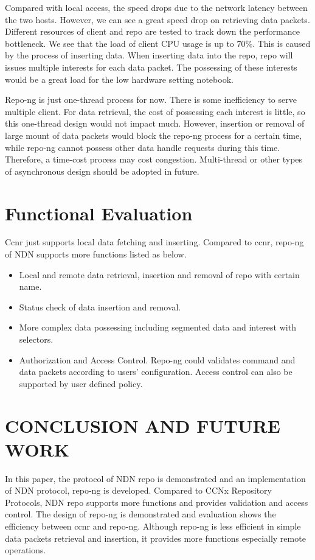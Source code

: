 \documentclass{acm_proc_article-sp}
\begin{document}
Compared with local access, the speed drops due to the network latency between the two hosts. However, we can see a great speed drop on retrieving data packets. Different resources of client and repo are tested to track down the performance bottleneck. We see that the  load of client CPU usage is up to 70\%. This is caused by the process of inserting data. When inserting data into the repo, repo will issues multiple interests for each data packet. The possessing of these interests would be a great load for the low hardware setting notebook.

Repo-ng is just one-thread process for now. There is some inefficiency to serve multiple client. For data retrieval, the cost of possessing each interest is little, so this one-thread design would not impact much. However, insertion or removal of large mount of data packets would block the repo-ng process for a certain time, while repo-ng cannot possess other data handle requests during this time.  Therefore, a time-cost process may cost congestion. Multi-thread or other types of asynchronous design should be adopted in future.

\section{Functional Evaluation}

Ccnr just supports local data fetching and inserting. Compared to ccnr, repo-ng of NDN supports more functions listed as below.

\begin{itemize}
\item Local and remote data retrieval, insertion and removal of repo with certain name.
\item Status check of data insertion and removal.
\item More complex data possessing including segmented data and interest with selectors.
\item Authorization and Access Control. Repo-ng could validates command and data packets according to users' configuration. Access control can also be supported by user defined policy.
\end{itemize}

\section{CONCLUSION AND FUTURE WORK}

In this paper, the protocol of NDN repo is demonstrated and an implementation of NDN protocol, repo-ng is developed. Compared to CCNx Repository Protocols, NDN repo supports more functions and provides validation and access control. The design of repo-ng is demonstrated and evaluation shows the efficiency between ccnr and repo-ng. Although repo-ng is less efficient in simple data packets retrieval and insertion, it provides more functions especially remote operations.
\end{document}
